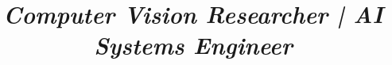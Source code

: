 \documentclass[11pt, a4paper, sans, final]{moderncv}
\title{\emph{Computer Vision Researcher | AI Systems Engineer}}
\begin{document}
\newcommand{\jobTitle}{AI Systems \& Computer Vision Research Engineer}
\newcommand{\companyName}{ asdf }


\end{document}
